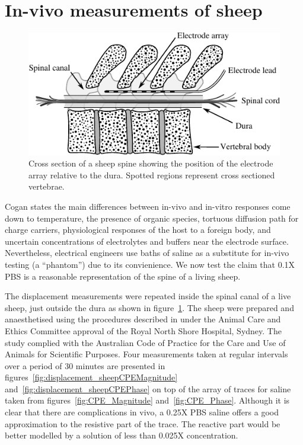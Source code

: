\documentclass[journal, a4paper]{IEEEtran}
\begin{document}
\section{In-vivo measurements of sheep}

\begin{figure}
    \begin{center}
        \includegraphics{graphics/sheepSpine}
    \end{center}
    \caption{Cross section of a sheep spine showing the position of the electrode array relative to the dura. Spotted regions represent cross sectioned vertebrae.}
    \label{fig:sheepSpine}
\end{figure}
Cogan states the main differences between in-vivo and in-vitro responses come down to temperature, the presence of organic species, tortuous diffusion path for charge carriers, physiological responses of the host to a foreign body, and uncertain concentrations of electrolytes and buffers near the electrode surface.\cite{Cogan2008}
Nevertheless, electrical engineers use baths of saline as a substitute for in-vivo testing (a ``phantom'') due to its convienience.
We now test the claim that 0.1X PBS is a reasonable representation of the spine of a living sheep.

The displacement measurements were repeated inside the spinal canal of a live sheep, just outside the dura as shown in figure~\ref{fig:sheepSpine}. The sheep were prepared and anaesthetised using the procedures described in \cite{Parker2013} under the Animal Care and Ethics Committee approval of the Royal North Shore Hospital, Sydney. The study complied with the Australian Code of Practice for the Care and Use of Animals for Scientific Purposes.
Four measurements taken at regular intervals over a period of 30 minutes are presented in figures~\ref{fig:displacement_sheepCPEMagnitude} and~\ref{fig:displacement_sheepCPEPhase} on top of the array of traces for saline taken from figures~\ref{fig:CPE_Magnitude} and~\ref{fig:CPE_Phase}.
Although it is clear that there are complications in vivo, a 0.25X PBS saline offers a good approximation to the resistive part of the trace.
The reactive part would be better modelled by a solution of less than 0.025X concentration.
\end{document}
